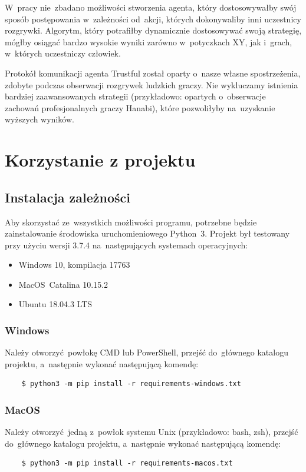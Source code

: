 \documentclass[declaration,shortabstract,inz]{iithesis}
\begin{document}
W~pracy nie~zbadano możliwości stworzenia agenta, który dostosowywałby swój sposób postępowania w~zależności od~akcji, których dokonywaliby inni uczestnicy rozgrywki. Algorytm, który potrafiłby dynamicznie dostosowywać swoją strategię, mógłby osiągać bardzo wysokie wyniki zarówno w~potyczkach XY, jak i~grach, w~których uczestniczy człowiek.

Protokół komunikacji agenta Trustful został oparty o~nasze własne spostrzeżenia, zdobyte podczas obserwacji rozgrywek ludzkich graczy. Nie wykluczamy istnienia bardziej zaawansowanych strategii (przykładowo: opartych o~obserwacje zachowań profesjonalnych graczy Hanabi), które pozwoliłyby na~uzyskanie wyższych wyników.

\appendix
\chapter{Korzystanie z projektu}

\section{Instalacja zależności}
Aby skorzystać ze~wszystkich możliwości programu, potrzebne będzie zainstalowanie środowiska uruchomieniowego Python~3. Projekt był testowany przy użyciu wersji 3.7.4 na~następujących systemach operacyjnych:
\begin{itemize}
	\item Windows 10, kompilacja 17763
	\item MacOS~Catalina 10.15.2
	\item Ubuntu 18.04.3 LTS
\end{itemize}

\subsection{Windows}

Należy otworzyć powłokę CMD lub PowerShell, przejść do~głównego katalogu projektu, a~następnie wykonać następującą komendę:
\begin{verbatim}
    $ python3 -m pip install -r requirements-windows.txt
\end{verbatim}

\subsection{MacOS}

Należy otworzyć jedną z~powłok systemu Unix (przykładowo: bash, zsh), przejść do~głównego katalogu projektu, a~następnie wykonać następującą komendę:
\begin{verbatim}
    $ python3 -m pip install -r requirements-macos.txt
\end{verbatim}
\end{document}
